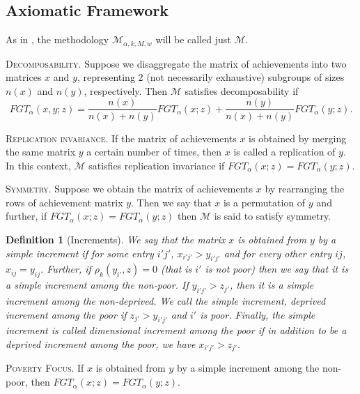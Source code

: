 \documentclass[english, a4paper,12pt]{article}
\newtheorem*{defn*}{Definition}
\begin{document}
\subsection{Axiomatic Framework} \label{sec:axioms}
As in , the methodology $\mathcal{M}_{\alpha, k, M, w}$ will be called just $\mathcal{M}$.

	\vspace{2ex}
		\textsc{Decomposability.} Suppose we disaggregate the matrix of achievements into two matrices $x$ and $y$, representing 2 (not necessarily exhaustive) subgroups of sizes $n(x)$ and $n(y)$, respectively. Then $\mathcal{M}$ satisfies decomposability if
	$$FGT_{\alpha}(x,y ; z) = \frac{n(x)}{n(x) + n(y)} FGT_{\alpha}(x; z) + \frac{n(y)}{n(x) + n(y)} FGT_{\alpha}(y; z).$$ 
	
	\vspace{2ex}
		\textsc{Replication invariance.} If the matrix of achievements $x$ is obtained by merging the same matrix $y$ a certain number of times, then $x$ is called a replication of $y$. In this context, $\mathcal{M}$ satisfies replication invariance if $FGT_{\alpha}(x ; z) = FGT_{\alpha}(y ; z)$.

	\vspace{2ex}
		\textsc{Symmetry.} Suppose we obtain the matrix of achievements $x$ by rearranging the rows of achievement matrix $y$. Then we say that $x$ is a permutation of $y$ and further, if $FGT_{\alpha}(x ; z) = FGT_{\alpha}(y; z)$ then $\mathcal{M}$ is said to satisfy symmetry.

\begin{defn*}[Increments] We say that the matrix $x$ is obtained from $y$ by \textit{a simple increment} if for some entry $i'j'$, $x_{i'j'} > y_{i'j'}$ and for every other entry $ij$, $x_{ij} = y_{ij}$. Further, if $\rho_{k}(y_{i'}, z) = 0$ (that is $i'$ is not poor) then we say that it is a simple increment \textit{among the non-poor}. If $y_{i'j'} > z_{j'}$, then it is a simple increment \textit{among the non-deprived}. We call the simple increment, \textit{deprived increment among the poor} if $z_{j'} > y_{i'j'}$ and $i'$ is poor. Finally, the simple increment is called \textit{dimensional increment among the poor} if in addition to be a deprived increment among the poor, we have $x_{i'j'} > z_{j'}$.
\end{defn*}

	\vspace{2ex}
		\textsc{Poverty Focus.} If $x$ is obtained from $y$ by a simple increment among the non-poor, then $FGT_{\alpha}(x ; z) = FGT_{\alpha}(y; z)$.
\end{document}
